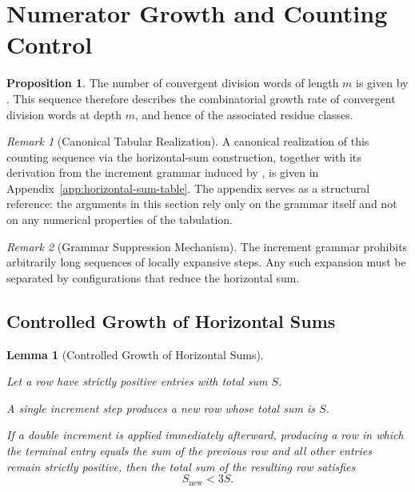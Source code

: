 \documentclass[12pt, oneside]{article}
\numberwithin{equation}{section}
\theoremstyle{definition}
\newtheorem{proposition}{Proposition}[section]
\theoremstyle{plain}
\newtheorem{lemma}[theorem]{Lemma}
\theoremstyle{remark}
\newtheorem*{remark}{Remark}
\begin{document}
\section{Numerator Growth and Counting Control}
\label{sec:numerator-growth}

\begin{proposition}
The number of convergent division words of length $m$ is given by .
This sequence therefore describes the combinatorial growth rate of convergent
division words at depth $m$, and hence of the associated residue classes.
\end{proposition}

\begin{remark}[Canonical Tabular Realization]
A canonical realization of this counting sequence via the horizontal-sum construction,
together with its derivation from the increment grammar induced by , is given
in Appendix~\ref{app:horizontal-sum-table}. The appendix serves as a structural reference:
the arguments in this section rely only on the grammar itself and not on any numerical
properties of the tabulation.
\end{remark}

\begin{remark}[Grammar Suppression Mechanism]
\label{rem:grammar-suppression}
The increment grammar prohibits arbitrarily long sequences of locally expansive steps.
Any such expansion must be separated by configurations that reduce the horizontal sum.
\end{remark}

\subsection{Controlled Growth of Horizontal Sums}

\begin{lemma}[Controlled Growth of Horizontal Sums]
\label{lem:controlled-horizontal-growth}

Let a row have strictly positive entries with total sum $S$.

A single increment step produces a new row whose total sum is $S$.

If a double increment is applied immediately afterward, producing a row in which
the terminal entry equals the sum of the previous row and all other entries remain
strictly positive, then the total sum of the resulting row satisfies
\[
S_{\mathrm{new}} < 3S.
\]
\end{lemma}
\end{document}
